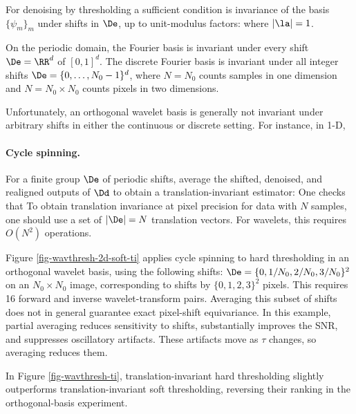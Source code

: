 For denoising by thresholding 
a sufficient condition is invariance of the basis $\{\psi_m\}_m$ under shifts in $\De$, up to unit-modulus factors:
where $|\la|=1$.

On the periodic domain, the Fourier basis is invariant under every shift $\De=\RR^d$ of $[0,1]^d$. The discrete Fourier basis is invariant under all integer shifts $\De=\{0,\ldots,N_0-1\}^d$, where $N=N_0$ counts samples in one dimension and $N=N_0 \times N_0$ counts pixels in two dimensions.

Unfortunately, an orthogonal wavelet basis 
is generally not invariant under arbitrary shifts in either the continuous or discrete setting. For instance, in 1-D,

  
\paragraph{Cycle spinning.}

For a finite group $\De$ of periodic shifts, average the shifted, denoised, and realigned outputs of $\Dd$ to obtain a translation-invariant estimator:
One checks that
To obtain translation invariance at pixel precision for data with $N$ samples, one should use a set of $|\De|=N$ translation vectors. For wavelets, this requires $O(N^2)$ operations.

Figure \ref{fig-wavthresh-2d-soft-ti} applies cycle spinning to hard thresholding in an orthogonal wavelet basis, using the following shifts:
$\De = \{ 0, 1/N_0, 2/N_0, 3/N_0 \}^2$ on an $N_0\times N_0$ image, corresponding to shifts by $\{ 0, 1, 2, 3 \}^2$ pixels.
This requires 16 forward and inverse wavelet-transform pairs. Averaging this subset of shifts does not in general guarantee exact pixel-shift equivariance. In this example, partial averaging reduces sensitivity to shifts, substantially improves the SNR, and suppresses oscillatory artifacts. These artifacts move as $\tau$ changes, so averaging reduces them.

In Figure \ref{fig-wavthresh-ti}, translation-invariant hard thresholding slightly outperforms translation-invariant soft thresholding, reversing their ranking in the orthogonal-basis experiment.                                                                                               

